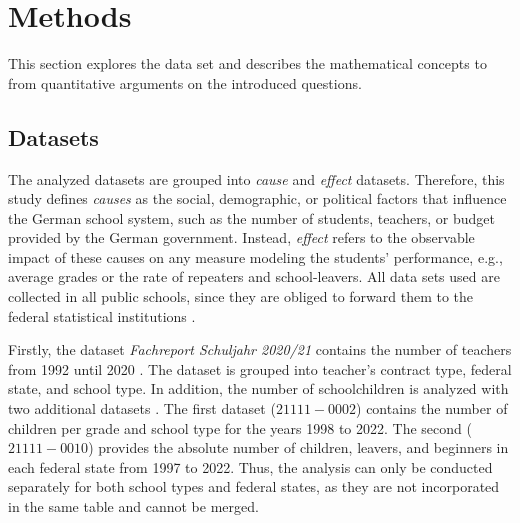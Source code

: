 \section{Methods}
This section explores the data set and describes the mathematical concepts to from quantitative arguments on the introduced questions.



\subsection{Datasets}\label{subsec:datasets}
The analyzed datasets are grouped into \emph{cause} and \emph{effect} datasets. Therefore, this study defines \emph{causes} as the social, demographic, or political factors that  influence the German school system, such as the number of students, teachers, or budget provided by the German government. Instead, \emph{effect} refers to the observable impact of these causes on any measure modeling the students' performance, e.g., average grades or the rate of repeaters and school-leavers. All data sets used are collected in all public schools, since they are obliged to forward them to the federal statistical institutions \cite{statistische_bundesamt_statistisches_2024,kultusminister_konferenz_abiturnoten_nodate}.

Firstly, the dataset \textit{Fachreport Schuljahr 2020/21} contains the number of teachers from 1992 until 2020 \cite{statistische_bundesamt_allgemeinbildende_2022}. The dataset is grouped into teacher's contract type, federal state, and school type. In addition, the number of schoolchildren is analyzed with two additional datasets \cite{statistische_bundesamt_statistisches_2024}. The first dataset (\href{https://www-genesis.destatis.de/genesis//online?operation=table&code=21111-0002&bypass=true&levelindex=0&levelid=1706352545984#abreadcrumb}{$21111-0002$}) contains the number of children per grade and school type  for the years 1998 to 2022. The second (\href{https://www-genesis.destatis.de/genesis//online?operation=table&code=21111-0010&bypass=true&levelindex=0&levelid=1706352536762#abreadcrumb}{$21111-0010$}) provides the absolute number of children, leavers, and beginners in each federal state from 1997 to 2022. Thus, the analysis can only be conducted separately for both school types and federal states, as they are not incorporated in the same table and cannot be merged.

